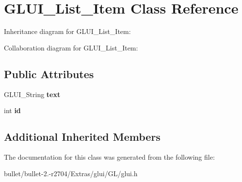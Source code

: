 \hypertarget{class_g_l_u_i___list___item}{\section{G\+L\+U\+I\+\_\+\+List\+\_\+\+Item Class Reference}
\label{class_g_l_u_i___list___item}
}


Inheritance diagram for G\+L\+U\+I\+\_\+\+List\+\_\+\+Item\+:


Collaboration diagram for G\+L\+U\+I\+\_\+\+List\+\_\+\+Item\+:
\subsection*{Public Attributes}
\begin{DoxyCompactItemize}
\item 
\hypertarget{class_g_l_u_i___list___item_a8d7db7c4b7dd085352de5d1a6b849da2}{G\+L\+U\+I\+\_\+\+String {\bfseries text}}\label{class_g_l_u_i___list___item_a8d7db7c4b7dd085352de5d1a6b849da2}

\item 
\hypertarget{class_g_l_u_i___list___item_a329b7a460a0e449e4bb0bdc2e8ba519c}{int {\bfseries id}}\label{class_g_l_u_i___list___item_a329b7a460a0e449e4bb0bdc2e8ba519c}

\end{DoxyCompactItemize}
\subsection*{Additional Inherited Members}


The documentation for this class was generated from the following file\+:\begin{DoxyCompactItemize}
\item 
bullet/bullet-\/2.-\/r2704/\+Extras/glui/\+G\+L/glui.\+h\end{DoxyCompactItemize}
